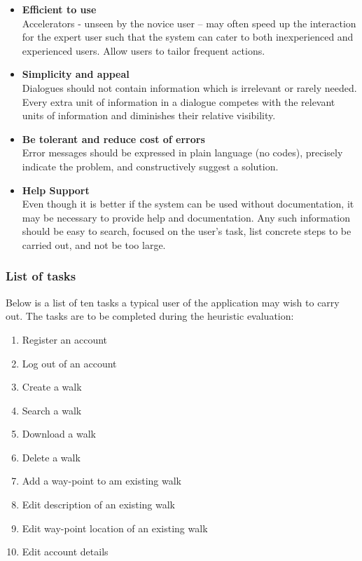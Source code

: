 \documentclass[11pt,a4paper]{article}
\begin{document}
\begin{itemize}
  \item \textbf{Efficient to use}\\ Accelerators - unseen by the novice user -- may often speed up the interaction for the expert user such that the system can cater to both inexperienced and experienced users. Allow users to tailor frequent actions.
  \item \textbf{Simplicity and appeal}\\ Dialogues should not contain information which is irrelevant or rarely needed. Every extra unit of information in a dialogue competes with the relevant units of information and diminishes their relative visibility.
  \item \textbf{Be tolerant and reduce cost of errors}\\ Error messages should be expressed in plain language (no codes), precisely indicate the problem, and constructively suggest a solution.
  \item \textbf{Help Support}\\ Even though it is better if the system can be used without documentation, it may be necessary to provide help and documentation. Any such information should be easy to search, focused on the user's task, list concrete steps to be carried out, and not be too large.
\end{itemize}

\subsubsection{List of tasks}

Below is a list of ten tasks a typical user of the application may wish to carry out. The tasks are to be completed during the heuristic evaluation:

\begin{enumerate}
  \item Register an account
  \item Log out of an account
  \item Create a walk
  \item Search a walk
  \item Download a walk
  \item Delete a walk
  \item Add a way-point to am existing walk
  \item Edit description of an existing walk
  \item Edit way-point location of an existing walk
  \item Edit account details
\end{enumerate}
\end{document}
